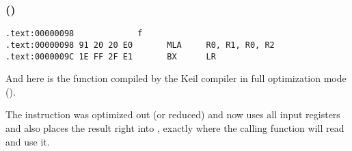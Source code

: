 ﻿\subsubsection{\OptimizingKeilVI (\ARMMode)}

\begin{lstlisting}[label=ARM_leaf_example1]
.text:00000098             f
.text:00000098 91 20 20 E0       MLA     R0, R1, R0, R2
.text:0000009C 1E FF 2F E1       BX      LR
\end{lstlisting}


And here is the \ttf function compiled by the Keil compiler in full optimization mode (\Othree).

The \MOV instruction was optimized out (or reduced) and now  uses all 
input registers and also places the result right into ,
exactly where the calling function will read and use it.
